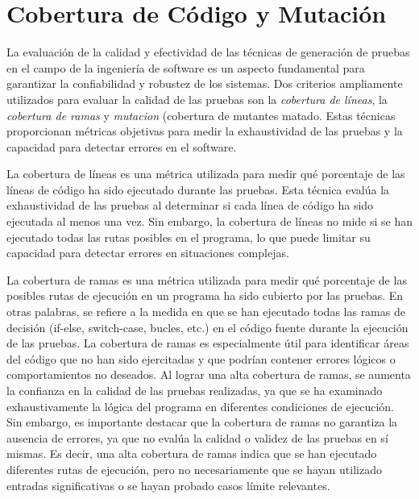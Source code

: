 



\section{Cobertura de Código y Mutación}
\label{sec:coverage}
La evaluación de la calidad y efectividad de las técnicas de generación de pruebas en el campo de la ingeniería de software es un aspecto fundamental para garantizar la confiabilidad y robustez de los sistemas. Dos criterios ampliamente utilizados para evaluar la calidad de las pruebas son la \emph{cobertura de líneas}, la \emph{cobertura de ramas} y \emph{mutacion} (cobertura de mutantes matado. Estas técnicas proporcionan métricas objetivas para medir la exhaustividad de las pruebas y la capacidad para detectar errores en el software.

La cobertura de líneas es una métrica utilizada para medir qué porcentaje de las líneas de código ha sido ejecutado durante las pruebas. 
Esta técnica evalúa la exhaustividad de las pruebas al determinar si cada línea de código ha sido ejecutada al menos una vez. 
Sin embargo, la cobertura de líneas no mide si se han ejecutado todas las rutas posibles en el programa, lo que puede limitar su capacidad para detectar errores en situaciones complejas.

La cobertura de ramas es una métrica utilizada para medir qué porcentaje de las posibles rutas de ejecución en un programa ha sido cubierto por las pruebas. En otras palabras, se refiere a la medida en que se han ejecutado todas las ramas de decisión (if-else, switch-case, bucles, etc.) en el código fuente durante la ejecución de las pruebas. La cobertura de ramas es especialmente útil para identificar áreas del código que no han sido ejercitadas y que podrían contener errores lógicos o comportamientos no deseados.
Al lograr una alta cobertura de ramas, se aumenta la confianza en la calidad de las pruebas realizadas, ya que se ha examinado exhaustivamente la lógica del programa en diferentes condiciones de ejecución. Sin embargo, es importante destacar que la cobertura de ramas no garantiza la ausencia de errores, ya que no evalúa la calidad o validez de las pruebas en sí mismas. Es decir, una alta cobertura de ramas indica que se han ejecutado diferentes rutas de ejecución, pero no necesariamente que se hayan utilizado entradas significativas o se hayan probado casos límite relevantes.

